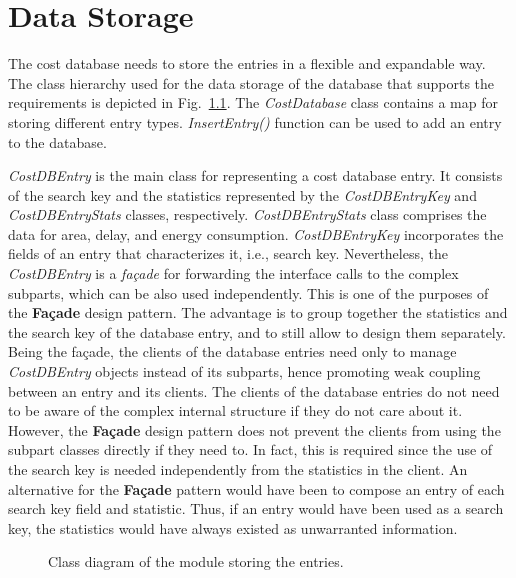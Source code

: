 \documentclass[a4paper,twoside]{tce}
\begin{document}
\chapter{Data Storage}
\label{cha:data_storage}

The cost database needs to store the entries in a flexible and
expandable way. The class hierarchy used for the data storage of the
database that supports the requirements is depicted in
Fig.~\ref{fig:class_entry}. The \emph{CostDatabase} class contains a
map for storing different entry types. \emph{InsertEntry()} function
can be used to add an entry to the database.

\emph{CostDBEntry} is the main class for representing a cost database
entry. It consists of the search key and the statistics represented by
the \emph{CostDBEntryKey} and \emph{CostDBEntryStats} classes,
respectively. \emph{CostDBEntryStats} class comprises the data for
area, delay, and energy consumption. \emph{CostDBEntryKey}
incorporates the fields of an entry that characterizes it, i.e.,
search key. Nevertheless, the \emph{CostDBEntry} is a
\emph{fa\c{c}ade} for forwarding the interface calls to the complex
subparts, which can be also used independently. This is one of the
purposes of the \textbf{Fa\c{c}ade} design pattern. The advantage is
to group together the statistics and the search key of the database
entry, and to still allow to design them separately. Being the
fa\c{c}ade, the clients of the database entries need only to manage
\emph{CostDBEntry} objects instead of its subparts, hence promoting
weak coupling between an entry and its clients. The clients of the
database entries do not need to be aware of the complex internal
structure if they do not care about it. However, the
\textbf{Fa\c{c}ade} design pattern does not prevent the clients from
using the subpart classes directly if they need to. In fact, this is
required since the use of the search key is needed independently from
the statistics in the client. An alternative for the
\textbf{Fa\c{c}ade} pattern would have been to compose an entry of
each search key field and statistic. Thus, if an entry would have been
used as a search key, the statistics would have always existed as
unwarranted information.~\cite{DesignPatterns}

\begin{figure}[tb]
\centerline{}
\caption{Class diagram of the module storing the entries.}
\label{fig:class_entry}
\end{figure}
\end{document}
